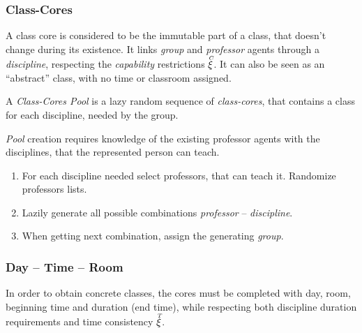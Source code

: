 \documentclass[../../ThesisDoc]{subfiles}
\begin{document}
\subsubsection{Class-Cores}
\label{sec:solution-CC}

A class core is considered to be the immutable part of a class, that doesn't
change during its existence. It links \emph{group} and \emph{professor} agents
through a \emph{discipline}, respecting the \emph{capability} restrictions $\accentset{C}{\xi}$.
It can also be seen as an ``abstract'' class, with no time or classroom assigned.

A \emph{Class-Cores Pool} is a lazy random sequence of \emph{class-cores},
that contains a class for each discipline, needed by the group.

\emph{Pool} creation requires knowledge of the existing professor agents with
the disciplines, that the represented person can teach.
\begin{enumerate}
  \item For each discipline needed select professors, that can teach it.
        Randomize professors lists.
  \item Lazily generate all possible combinations \emph{professor} -- \emph{discipline}.
  \item When getting next combination, assign the generating \emph{group}.
\end{enumerate}

\subsubsection{Day -- Time -- Room}
\label{sec:solution-DTR}

In order to obtain concrete classes, the cores must be completed with day, room,
beginning time and duration (end time), while respecting both discipline duration
requirements and time consistency $\accentset{T}{\xi}$.
\end{document}
